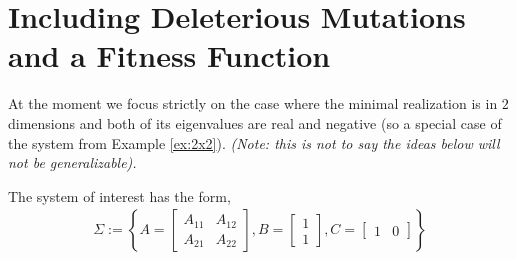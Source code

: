 \documentclass[11 pt]{article}
\newcommand{\jss}[1]{{\color{olive}\it #1}}
\begin{document}
\section{Including Deleterious Mutations and a Fitness Function}\label{sec:del}

  \begin{minipage}{0.5\textwidth}
  At the moment we focus strictly on the case where the minimal realization is in $2$ dimensions and both of its eigenvalues are real and negative (so a special case of the system from Example \ref{ex:2x2}). \jss{(Note: this is not to say the ideas below will not be generalizable).}

    The system of interest has the form,
  \begin{align*}
    \Sigma := \left\{ A = \begin{bmatrix} A_{11} & A_{12} \\ A_{21} & A_{22} \end{bmatrix}, B = \begin{bmatrix} 1 \\ 1 \end{bmatrix}, C = \begin{bmatrix} 1 & 0 \end{bmatrix} \right\}
  \end{align*}
  \end{minipage}%
\end{document}
